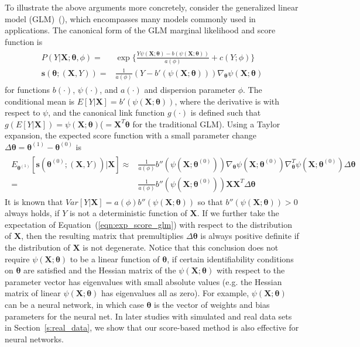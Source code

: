 \documentclass[twoside,11pt]{article}
\begin{document}
To illustrate the above arguments more concretely, consider the generalized linear model (GLM)~(\cite{nelder1972generalized}), which encompasses many models commonly used in applications. The canonical form of the GLM marginal likelihood and score function is
\begin{align}
\begin{aligned}
P(Y|\bm{X};\bm { \theta}, \phi) =& \exp\{\frac{Y \psi(\bm{X};\bm { \theta})-b( \psi(\bm{X};\bm { \theta}))}{ a ( \phi)} + c(Y; \phi)\} \\
\bm {s}(\bm { \theta};(\bm {X}, Y)) =& \frac{1}{a( \phi)}(Y - b'( \psi (\bm{X};\bm { \theta} )))\nabla _{ \bm { \theta}} \psi(\bm{X};\bm { \theta} )
\end{aligned}
\label{eqn:score_glm}
\end{align}
for functions $b(\cdot)$, $ \psi(\cdot)$, and $a(\cdot)$ and dispersion parameter $\phi$. The conditional mean is $E[Y|\bm{X}]=b'(\psi(\bm{X};\bm{\theta}))$, where the derivative is with respect to $\psi$, and the canonical link function $g(\cdot)$ is defined such that $g(E[Y|\bm{X}])=\psi(\bm{X};\bm{\theta})$($=\bm{X}^T\bm{\theta}$ for the traditional GLM). Using a Taylor expansion, the expected score function with a small parameter change $ \Delta \bm { \theta}= \bm { \theta}^{(1)}-\bm { \theta}^{(0)}$ is
\begin{align}
\begin{aligned}
E _{\bm { \theta} ^{(1)}}[\bm {s}(\bm { \theta} ^{(0)};(\bm {X}, Y))|\bm{X}] \approx& \frac{1}{a ( \phi)}b''( \psi(\bm{X}; \bm { \theta} ^{(0)}))\nabla _{ \bm { \theta}} \psi (\bm{X}; \bm { \theta} ^{ (0)}) \nabla _{\bm { \theta}}^T \psi (\bm{X}; \bm { \theta} ^{ (0)}) \Delta \bm { \theta} \\
=& \frac{1}{a ( \phi)}b''( \psi(\bm{X}; \bm { \theta} ^{(0)}))\bm {X}\bm {X}^T \Delta \bm { \theta}
\end{aligned}
\label{eqn:exp_score_glm}
\end{align}
It is known that $Var[Y|\bm{X}] = a ( \phi)b''(\psi (\bm{X}; \bm { \theta} ))$ so that $b''(\psi (\bm{X}; \bm { \theta} ))>0$ always holds, if $Y$ is not a deterministic function of $\bm{X}$. If we further take the expectation of Equation~(\ref{eqn:exp_score_glm}) with respect to the distribution of $\bm{X}$, then the resulting matrix that premultiplies $\Delta\bm{\theta}$ is always positive definite if the distribution of $\bm{X}$ is not degenerate. Notice that this conclusion does not require $ \psi (\bm{X}; \bm { \theta})$ to be a linear function of $\bm { \theta}$, if certain identifiability conditions on $\bm{\theta}$ are satisfied and the Hessian matrix of the $\psi(\bm{X};\bm{\theta})$ with respect to the parameter vector has eigenvalues with small absolute values (e.g. the Hessian matrix of linear $\psi(\bm{X};\bm{\theta})$ has eigenvalues all as zero). For example, $ \psi (\bm{X}; \bm { \theta})$ can be a neural network, in which case $\bm { \theta}$ is the vector of weights and bias parameters for the neural net. In later studies with simulated and real data sets in Section~\ref{s:real_data}, we show that our score-based method is also effective for neural networks.
\end{document}
